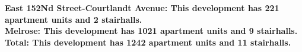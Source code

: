 \bf{East 152Nd Street-Courtlandt Avenue}: This development has 221 apartment units and 2 stairhalls.\\\bf{Melrose}: This development has 1021 apartment units and 9 stairhalls.\\\bf{Total}: This development has 1242 apartment units and 11 stairhalls.\\